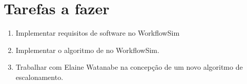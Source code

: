 \section{Tarefas a fazer}
\label{sec:tarefas_a_fazer}
	\begin{enumerate}
		\item Implementar requisitos de software no WorkflowSim
		\item Implementar o algoritmo de \cite{chaves:scheduling_software_requirements} 
		no WorkflowSim.
		\item Trabalhar com Elaine Watanabe na concepção de um novo algoritmo 
		de escalonamento.
	\end{enumerate}

